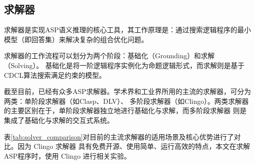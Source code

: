\subsection{求解器}
求解器是实现ASP语义推理的核心工具，其工作原理是：通过搜索逻辑程序的最小模型（即回答集）来解决复杂的组合优化问题。

求解器的工作流程可以划分为两个阶段：基础化（Grounding）和求解（Solving）。
基础化是将一阶逻辑程序实例化为命题逻辑形式，而求解则是基于CDCL算法搜索满足约束的模型。

截至目前，已经有众多ASP求解器。学术界和工业界所用的主流的求解器，可分为两类：单阶段求解器（如Clasp、DLV）、
多阶段求解器（如Clingo）。两类求解器的主要区别在于，单阶段求解器独立地进行基础化与求解，而多阶段求解器
则是集成了基础化与求解的交互式系统。

表\ref{tab:solver_comparison}对目前的主流求解器的适用场景及核心优势进行了对比。因为 Clingo 求解器
具有免费开源、使用简单、运行高效的特点，本文在求解 ASP程序时，使用 Clingo 进行相关实验。
